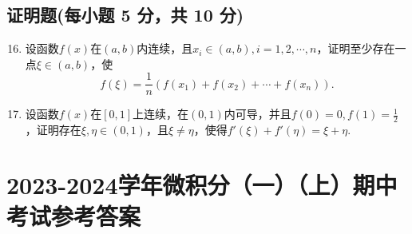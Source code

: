 \documentclass[../main.tex]{subfiles}
\begin{document}
\section{证明题(每小题 5 分，共 10 分)}
\begin{enumerate}
    \setcounter{enumi}{15}
    \item 设函数$f(x)$在$(a,b)$内连续，且$x_{i}\in(a,b),i=1,2,\cdots,n$，证明至少存在一点$\xi
              \in(a,b)$，使
          \[
              f(\xi)=\frac{1}{n}\left(f(x_{1})+f(x_{2})+\cdots+f(x_{n})\right).
          \]
          \vspace{10em}

    \item 设函数$f(x)$在$[0,1]$上连续，在$(0,1)$内可导，并且$f(0)=0,f(1)=\frac{1}{2}$，证明存在$\xi
              ,\eta\in(0,1)$，且$\xi\neq\eta$，使得$f'(\xi)+f'(\eta)=\xi+\eta$.
          \vspace{8em}
\end{enumerate}

\chapter{2023-2024学年微积分（一）（上）期中考试参考答案}
\end{document}
